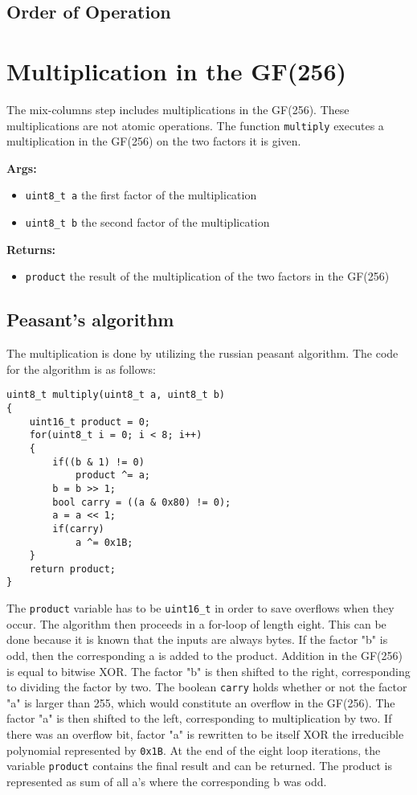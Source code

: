 \subsection{Order of Operation}


\section{Multiplication in the GF(256)}
\label{ch:dec_multiplication}
The mix-columns step includes multiplications in the GF(256). These multiplications are not atomic operations. The function \lstinline{multiply} executes a multiplication in the GF(256) on the two factors it is given.

\textbf{Args:}
\begin{itemize}
  \item \lstinline{uint8_t a} the first factor of the multiplication
  \item \lstinline{uint8_t b} the second factor of the multiplication
\end{itemize}

\textbf{Returns:}
\begin{itemize}
  \item \lstinline{product} the result of the multiplication of the two factors in the GF(256)
\end{itemize}

\subsection{Peasant's algorithm}
The multiplication is done by utilizing the russian peasant algorithm. The code for the algorithm is as follows:
\begin{lstlisting}
uint8_t multiply(uint8_t a, uint8_t b)
{
    uint16_t product = 0;
    for(uint8_t i = 0; i < 8; i++)
    {
        if((b & 1) != 0)
            product ^= a;
        b = b >> 1;
        bool carry = ((a & 0x80) != 0);
        a = a << 1;
        if(carry)
            a ^= 0x1B;
    }
    return product;
}
\end{lstlisting}

The \lstinline{product} variable has to be \lstinline{uint16_t} in order to save overflows when they occur. The algorithm then proceeds in a for-loop of length eight. This can be done because it is known that the inputs are always bytes. If the factor "b" is odd, then the corresponding a is added to the product. Addition in the GF(256) is equal to bitwise XOR. The factor "b" is then shifted to the right, corresponding to dividing the factor by two. The boolean \lstinline{carry} holds whether or not the factor "a" is larger than 255, which would constitute an overflow in the GF(256). The factor "a" is then shifted to the left, corresponding to multiplication by two. If there was an overflow bit, factor "a" is rewritten to be itself XOR the irreducible polynomial represented by \lstinline{0x1B}. At the end of the eight loop iterations, the variable \lstinline{product} contains the final result and can be returned. The product is represented as sum of all a's where the corresponding b was odd.

